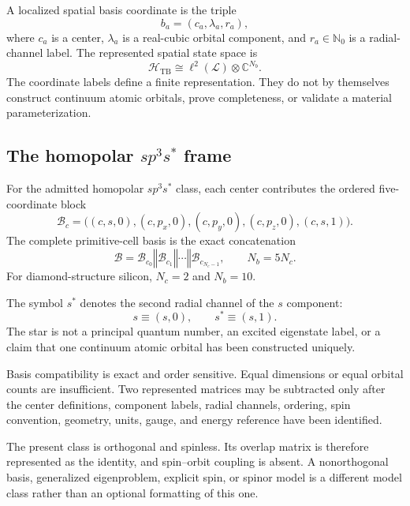 A localized spatial basis coordinate is the triple
\begin{equation}
  b_a=(c_a,\lambda_a,r_a),
\end{equation}
where $c_a$ is a center, $\lambda_a$ is a real-cubic orbital component, and
$r_a\in\mathbb N_0$ is a radial-channel label. The represented spatial state
space is
\begin{equation}
  \mathcal H_{\mathrm{TB}}
  \cong
  \ell^2(\mathcal L)\otimes\mathbb C^{N_b}.
\end{equation}
The coordinate labels define a finite representation. They do not by
themselves construct continuum atomic orbitals, prove completeness, or validate
a material parameterization.

\subsection{The homopolar \texorpdfstring{$sp^3s^{\ast}$}{sp3s*} frame}

For the admitted homopolar $sp^3s^{\ast}$ class, each center contributes the
ordered five-coordinate block
\begin{equation}
  \mathcal B_c
  =
  \bigl(
    (c,s,0),
    (c,p_x,0),
    (c,p_y,0),
    (c,p_z,0),
    (c,s,1)
  \bigr).
\end{equation}
The complete primitive-cell basis is the exact concatenation
\begin{equation}
  \mathcal B
  =
  \mathcal B_{c_0}\mathbin\Vert
  \mathcal B_{c_1}\mathbin\Vert\cdots\mathbin\Vert
  \mathcal B_{c_{N_c-1}},
  \qquad N_b=5N_c.
\end{equation}
For diamond-structure silicon, $N_c=2$ and $N_b=10$.

The symbol $s^{\ast}$ denotes the second radial channel of the $s$ component:
\begin{equation}
  s\equiv(s,0),
  \qquad
  s^{\ast}\equiv(s,1).
\end{equation}
The star is not a principal quantum number, an excited eigenstate label, or a
claim that one continuum atomic orbital has been constructed uniquely.

Basis compatibility is exact and order sensitive. Equal dimensions or equal
orbital counts are insufficient. Two represented matrices may be subtracted
only after the center definitions, component labels, radial channels, ordering,
spin convention, geometry, units, gauge, and energy reference have been
identified.

The present class is orthogonal and spinless. Its overlap matrix is therefore
represented as the identity, and spin--orbit coupling is absent. A
nonorthogonal basis, generalized eigenproblem, explicit spin, or spinor model
is a different model class rather than an optional formatting of this one.

